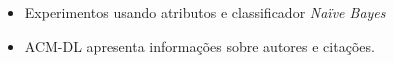\documentclass[10pt, red]{beamer}
\begin{document}
{\begin{itemize}
\begin{figure}[!h]
\end{figure}

    \item Experimentos usando atributos e classificador \textit{Naïve Bayes}
    \item ACM-DL apresenta informações sobre autores e citações.
    
\end{itemize}

}
\end{document}
